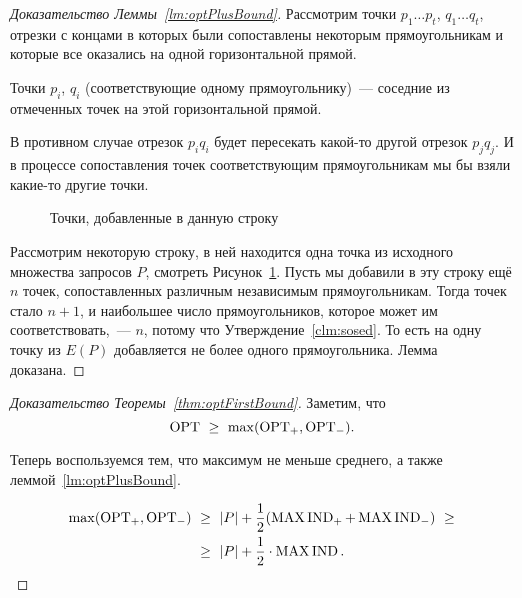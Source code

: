 \begin{proof}[Доказательство Леммы~\ref{lm:optPlusBound}]
Рассмотрим точки $p_1 \ldots p_t$, $q_1 \ldots q_t$, отрезки с концами в которых были сопоставлены некоторым прямоугольникам и которые все оказались на одной горизонтальной прямой.

\begin{clm} \label{clm:sosed}
	Точки $p_i$, $q_i$ (соответствующие одному прямоугольнику)~--- соседние из отмеченных точек на этой горизонтальной прямой.
\end{clm}

В противном случае отрезок $p_i q_i$ будет пересекать какой-то другой отрезок $p_j q_j$. И в процессе сопоставления точек соответствующим прямоугольникам мы бы взяли какие-то другие точки.

\begin{figure}[h] \centering
\caption{Точки, добавленные в данную строку}
\label{fig:nPoints}
\end{figure}

Рассмотрим некоторую строку, в ней находится одна точка из исходного множества запросов $P$, смотреть Рисунок~\ref{fig:nPoints}. Пусть мы добавили в эту строку ещё $n$ точек, сопоставленных различным независимым прямоугольникам. Тогда точек стало $n+1$, и наибольшее число прямоугольников, которое может им соответствовать,~--- $n$, потому что Утверждение~\ref{clm:sosed}. То есть на одну точку из $E(P)$ добавляется не более одного прямоугольника. Лемма доказана.
\end{proof}

\begin{proof}[Доказательство Теоремы~\ref{thm:optFirstBound}]
Заметим, что \[ \operatorname{OPT}\ \ge\ \max ( \operatorname{OPT}_+, \operatorname{OPT}_- ). \] \vspace{-8mm}

Теперь воспользуемся тем, что максимум не меньше среднего, а также леммой~\ref{lm:optPlusBound}. \vspace{-5mm}

\begin{align*}
	\max ( \operatorname{OPT}_+, \operatorname{OPT}_- )\ & \ge\ \lvert P\rvert + \frac{1}{2}
	( \operatorname{MAX\,IND}_+ + \operatorname{MAX\,IND}_- )\ \ge \\
	& \ge\ \lvert P\rvert + \frac{1}{2} \cdot \operatorname{MAX\,IND}.
\end{align*}

\vspace{-8mm} \end{proof}
